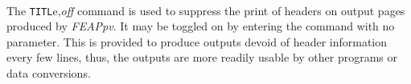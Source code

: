  \\{\smallskip}
\headb

The {\tt TITL}e,{\it off} command is used to suppress the print of headers on
output pages produced by {\sl FEAPpv}.  It may be toggled on by entering
the command with no parameter.
This is provided to produce outputs devoid of header information every
few lines, thus, the outputs are more readily usable by other programs
or data conversions.
\vfil\eject
